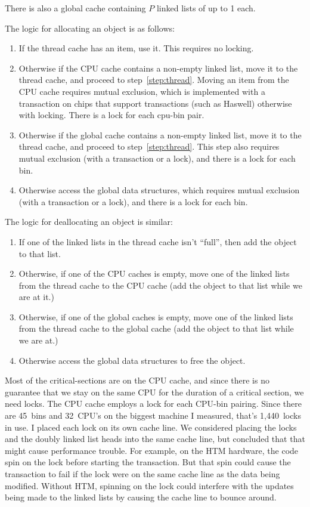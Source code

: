\documentclass[natbib,sort&compress]{sigplanconf}
\begin{document}
There is also a global cache containing $P$ linked lists of up to
\unit{1}\mebi\byte{} each. 

The logic for allocating an object is as follows:
\begin{enumerate}
\item If the thread cache has an item, use it.  This requires no
  locking. \label{step:thread}
\item Otherwise if the CPU cache contains a non-empty linked list,
  move it to the thread cache, and proceed to step~\ref{step:thread}.
  Moving an item from the CPU cache requires mutual exclusion, which
  is implemented with a transaction on chips that support transactions
  (such as Haswell) otherwise with locking. There is a lock for each
  cpu-bin pair.\label{step:cpu}
\item Otherwise if the global cache contains a non-empty linked list,
  move it to the thread cache, and proceed to step~\ref{step:thread}.
  This step also requires mutual exclusion (with a transaction or a
  lock), and there is a lock for each bin.
\item Otherwise access the global data structures, which requires
  mutual exclusion (with a transaction or a lock), and there is a lock
  for each bin.
\end{enumerate}

The logic for deallocating an object is similar:
\begin{enumerate}
\item If one of the linked lists in the thread cache isn't ``full'',
  then add the object to that list.
\item Otherwise, if one of the CPU caches is empty, move one of the
  linked lists from the thread cache to the CPU cache (add the object
  to that list while we are at it.)
\item Otherwise, if one of the global caches is empty, move one of the
  linked lists from the thread cache to the global cache (add the
  object to that list while we are at.)
\item Otherwise access the global data structures to free the object.
\end{enumerate}

Most of the critical-sections are on the CPU cache, and since there is
no guarantee that we stay on the same CPU for the duration of a
critical section, we need locks.  The CPU cache employs a lock for
each CPU-bin pairing.  Since there are 45~bins and 32~CPU's on the
biggest machine I measured, that's 1,440~locks in use.  I placed each
lock on its own cache line.  We considered placing the locks and the
doubly linked list heads into the same cache line, but concluded that
that might cause performance trouble.  For example, on the HTM
hardware, the code spin on the lock before starting the transaction.
But that spin could cause the transaction to fail if the lock were on
the same cache line as the data being modified.  Without HTM, spinning
on the lock could interfere with the updates being made to the linked
lists by causing the cache line to bounce around.
\end{document}
